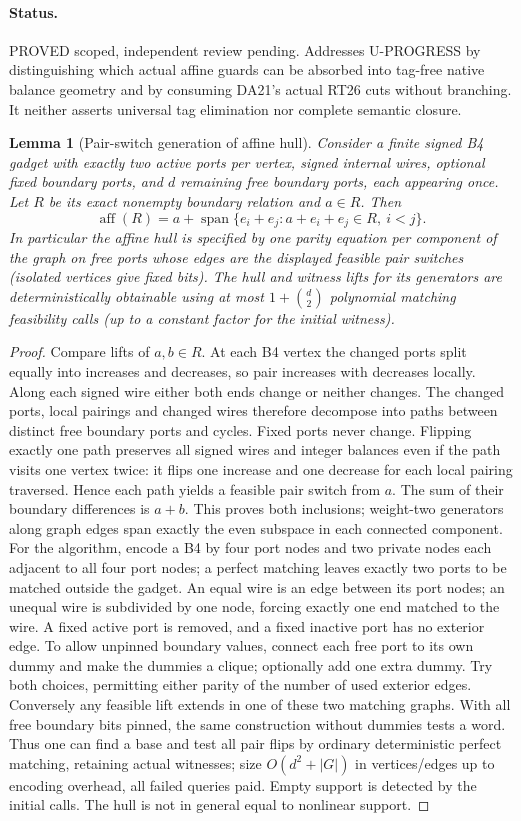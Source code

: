 \documentclass[11pt]{article}
\newtheorem{lemma}[theorem]{Lemma}
\begin{document}
\paragraph{Status.} PROVED scoped, independent review pending. Addresses U-PROGRESS by distinguishing which actual affine guards can be absorbed into tag-free native balance geometry and by consuming DA21's actual RT26 cuts without branching. It neither asserts universal tag elimination nor complete semantic closure.
\begin{lemma}[Pair-switch generation of affine hull]\label{lem:bw21-hull}
Consider a finite signed B4 gadget with exactly two active ports per vertex, signed internal wires, optional fixed boundary ports, and $d$ remaining free boundary ports, each appearing once. Let $R$ be its exact nonempty boundary relation and $a\in R$. Then
\[
\operatorname{aff}(R)=a+\operatorname{span}\{e_i+e_j:a+e_i+e_j\in R,\ i<j\}.
\]
In particular the affine hull is specified by one parity equation per component of the graph on free ports whose edges are the displayed feasible pair switches (isolated vertices give fixed bits). The hull and witness lifts for its generators are deterministically obtainable using at most $1+\binom d2$ polynomial matching feasibility calls (up to a constant factor for the initial witness).
\end{lemma}
\begin{proof}
Compare lifts of $a,b\in R$. At each B4 vertex the changed ports split equally into increases and decreases, so pair increases with decreases locally. Along each signed wire either both ends change or neither changes. The changed ports, local pairings and changed wires therefore decompose into paths between distinct free boundary ports and cycles. Fixed ports never change. Flipping exactly one path preserves all signed wires and integer balances even if the path visits one vertex twice: it flips one increase and one decrease for each local pairing traversed. Hence each path yields a feasible pair switch from $a$. The sum of their boundary differences is $a+b$. This proves both inclusions; weight-two generators along graph edges span exactly the even subspace in each connected component. For the algorithm, encode a B4 by four port nodes and two private nodes each adjacent to all four port nodes; a perfect matching leaves exactly two ports to be matched outside the gadget. An equal wire is an edge between its port nodes; an unequal wire is subdivided by one node, forcing exactly one end matched to the wire. A fixed active port is removed, and a fixed inactive port has no exterior edge. To allow unpinned boundary values, connect each free port to its own dummy and make the dummies a clique; optionally add one extra dummy. Try both choices, permitting either parity of the number of used exterior edges. Conversely any feasible lift extends in one of these two matching graphs. With all free boundary bits pinned, the same construction without dummies tests a word. Thus one can find a base and test all pair flips by ordinary deterministic perfect matching, retaining actual witnesses; size $O(d^2+|G|)$ in vertices/edges up to encoding overhead, all failed queries paid. Empty support is detected by the initial calls. The hull is not in general equal to nonlinear support.
\end{proof}
\end{document}
